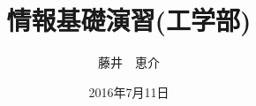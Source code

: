 \documentclass[a4paper,12pt]{jsbook}
\begin{document}
\author{藤井　恵介}
\title{情報基礎演習(工学部)}
\date{2016年7月11日}

\frontmatter
\maketitle
\tableofcontents

\mainmatter






%

\backmatter

\section{}
\end{document}
